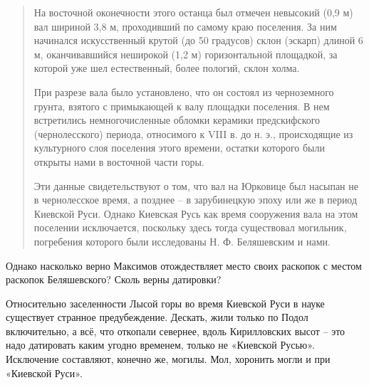 \begin{quotation}
На восточной оконечности этого останца был отмечен невысокий (0,9 м) вал шириной 3,8 м, проходивший по самому краю поселения. За ним начинался искусственный крутой (до 50 градусов) склон (эскарп) длиной 6 м, оканчивавшийся неширокой (1,2 м) горизонтальной площадкой, за которой уже шел естественный, более пологий, склон холма.

При разрезе вала было установлено, что он состоял из черноземного грунта, взятого с примыкающей к валу площадки поселения. В нем встретились немногочисленные обломки керамики предскифского (чернолесского) периода, относимого к VIII в. до н. э., происходящие из культурного слоя поселения этого времени, остатки которого были открыты нами в восточной части горы.

Эти данные свидетельствуют о том, что вал на Юрковице был насыпан не в чернолесское время, а позднее – в зарубинецкую эпоху или же в период Киевской Руси. Однако Киевская Русь как время сооружения вала на этом поселении исключается, поскольку здесь тогда существовал могильник, погребения которого были исследованы Н. Ф. Беляшевским и нами.
\end{quotation}

Однако насколько верно Максимов отождествляет место своих раскопок с местом раскопок Беляшевского? Сколь верны датировки?

Относительно заселенности Лысой горы во время Киевской Руси в науке существует странное предубеждение. Дескать, жили только по Подол включительно, а всё, что откопали севернее, вдоль Кирилловских высот – это надо датировать каким угодно временем, только не «Киевской Русью». Исключение составляют, конечно же, могилы. Мол, хоронить могли и при «Киевской Руси».


